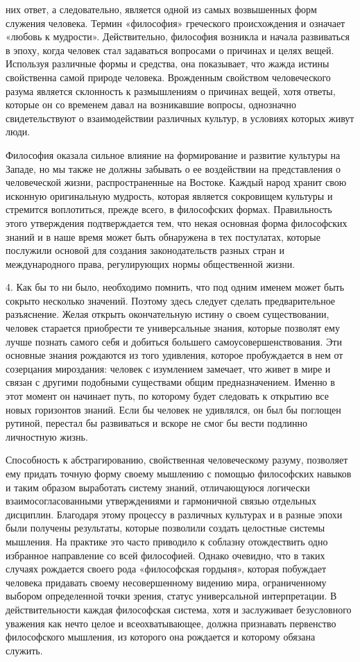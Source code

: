 \documentclass[a5paper,10pt]{article}
\begin{document}
них ответ, а следовательно, является одной из самых возвышенных форм служения
человека. Термин «философия» греческого происхождения и означает «любовь к
мудрости». Действительно, философия возникла и начала развиваться в эпоху,
когда человек стал задаваться вопросами о причинах и целях вещей. Используя
различные формы и средства, она показывает, что жажда истины свойственна самой
природе человека. Врожденным свойством человеческого разума является склонность
к размышлениям о причинах вещей, хотя ответы, которые он со временем давал на
возникавшие вопросы, однозначно свидетельствуют о взаимодействии различных
культур, в условиях которых живут люди.

Философия оказала сильное влияние на формирование и развитие культуры на
Западе, но мы также не должны забывать о ее воздействии на представления о
человеческой жизни, распространенные на Востоке. Каждый народ хранит свою
исконную оригинальную мудрость, которая является сокровищем культуры и
стремится воплотиться, прежде всего, в философских формах. Правильность этого
утверждения подтверждается тем, что некая основная форма философских знаний и в
наше время может быть обнаружена в тех постулатах, которые послужили основой
для создания законодательств разных стран и международного права, регулирующих
нормы общественной жизни.

4. Как бы то ни было, необходимо помнить, что под одним именем может быть
сокрыто несколько значений. Поэтому здесь следует сделать предварительное
разъяснение. Желая открыть окончательную истину о своем существовании, человек
старается приобрести те универсальные знания, которые позволят ему лучше
познать самого себя и добиться большего самоусовершенствования. Эти основные
знания рождаются из того удивления, которое пробуждается в нем от созерцания
мироздания: человек с изумлением замечает, что живет в мире и связан с другими
подобными существами общим предназначением. Именно в этот момент он начинает
путь, по которому будет следовать к открытию все новых горизонтов знаний. Если
бы человек не удивлялся, он был бы поглощен рутиной, перестал бы развиваться и
вскоре не смог бы вести подлинно личностную жизнь.

Способность к абстрагированию, свойственная человеческому разуму, позволяет ему
придать точную форму своему мышлению с помощью философских навыков и таким
образом выработать систему знаний, отличающуюся логически взаимосогласованными
утверждениями и гармоничной связью отдельных дисциплин. Благодаря этому
процессу в различных культурах и в разные эпохи были получены результаты,
которые позволили создать целостные системы мышления. На практике это часто
приводило к соблазну отождествить одно избранное направление со всей
философией. Однако очевидно, что в таких случаях рождается своего рода
«философская гордыня», которая побуждает человека придавать своему
несовершенному видению мира, ограниченному выбором определенной точки зрения,
статус универсальной интерпретации. В действительности каждая философская
система, хотя и заслуживает безусловного уважения как нечто целое и
всеохватывающее, должна признавать первенство философского мышления, из
которого она рождается и которому обязана служить.
\end{document}
